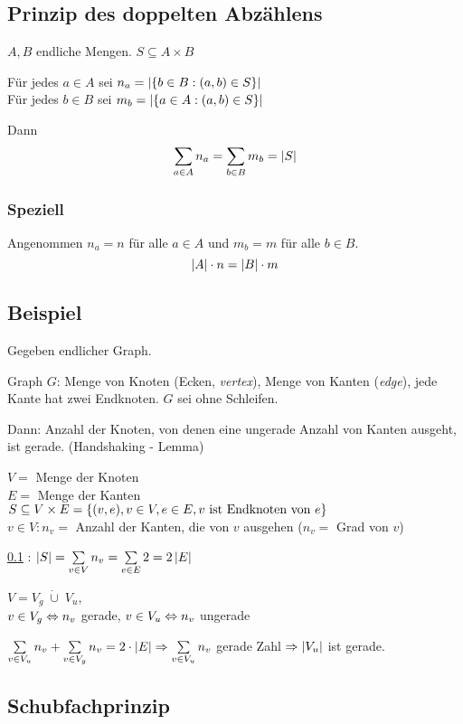 \subsection{Prinzip des doppelten Abzählens}
\label{subsec:doppAbzaehlPrinzip}

$A, B$ endliche Mengen.
$S \subseteq A \times B$

Für jedes $a \in A$ sei $n_a = \left|\left\{b \in B : (a, b) \in S\right\}\right|$
\\Für jedes $b \in B$ sei $m_b = \left|\left\{a \in A : (a, b) \in S\right\}\right|$

Dann \[ \sum_{a \in A}n_a = \sum_{b \in B} m_b = \abs{S} \]


\subsubsection*{Speziell}

Angenommen $n_a = n$ für alle $a \in A$ und $m_b = m$ für alle $b \in B$.
%
\[\left|A\right|\cdot n = \left|B\right| \cdot m \]

\subsection[Beispiel : Handshaking-Lemma]{Beispiel}
Gegeben endlicher Graph. 

Graph $G$: Menge von Knoten (Ecken, \emph{vertex}), Menge von Kanten (\emph{edge}), jede Kante hat zwei Endknoten.
%
$G$ sei ohne Schleifen.

Dann: Anzahl der Knoten, von denen eine ungerade Anzahl von Kanten ausgeht, ist gerade. (Handshaking - Lemma)

$V=$ Menge der Knoten
\\$E=$ Menge der Kanten
\\$S \subseteq V \times E = \left\{(v, e), v \in V, e \in E, v \text{ ist Endknoten von } e\right\}$
\\$v \in V : n_v =$ Anzahl der Kanten, die von $v$ ausgehen ($n_v =$ Grad von $v$)

\ref{subsec:doppAbzaehlPrinzip} : 
$\abs{S} = \sum_{v\in V} n_v = \sum_{e \in E} 2 = 2 \abs{E}$

$V = V_g \;\dot{\cup}\; V_u$,
\\$v \in V_g \Leftrightarrow n_v$ gerade,
$v \in V_u \Leftrightarrow n_v$ ungerade

$\sum_{v\in V_u}n_v + \sum_{v \in V_g}n_v = 2 \cdot \abs{E} \Rightarrow \sum_{v \in V_u}n_v$ gerade Zahl
$\Rightarrow \left|V_u\right|$ ist gerade.

\subsection{Schubfachprinzip}
\label{subsec:schubfachprinzip}

